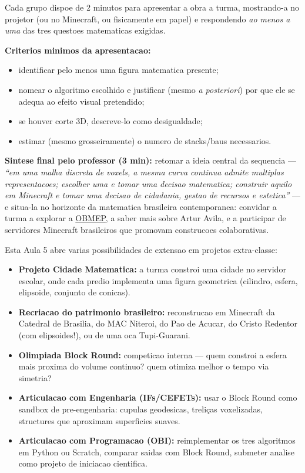 \documentclass[12pt,a4paper]{scrartcl}
\newcommand{\tempo}[1]{\textnormal{\footnotesize\color{bg!90!white}\textsf{#1}}}
\begin{document}
\begin{atividade}[5.4 --- Apresentacao e sintese coletiva \quad\tempo{10 min}]\label{at:54}
Cada grupo dispoe de 2 minutos para apresentar a obra a turma, mostrando-a no projetor (ou no Minecraft, ou fisicamente em papel) e respondendo \emph{ao menos a uma} das tres questoes matematicas exigidas.

\textbf{Criterios minimos da apresentacao:}
\begin{itemize}[leftmargin=1.3em,itemsep=0.1em,topsep=0.2em,nosep]
  \item identificar pelo menos uma figura matematica presente;
  \item nomear o algoritmo escolhido e justificar (mesmo \emph{a posteriori}) por que ele se adequa ao efeito visual pretendido;
  \item se houver corte 3D, descreve-lo como desigualdade;
  \item estimar (mesmo grosseiramente) o numero de stacks/baus necessarios.
\end{itemize}

\textbf{Sintese final pelo professor (3 min):} retomar a ideia central da sequencia --- \emph{\enquote{em uma malha discreta de voxels, a mesma curva continua admite multiplas representacoes; escolher uma e tomar uma decisao matematica; construir aquilo em Minecraft e tomar uma decisao de cidadania, gestao de recursos e estetica}} --- e situa-la no horizonte da matematica brasileira contemporanea: convidar a turma a explorar a \hyperref[sec:obmep]{OBMEP}, a saber mais sobre Artur Avila, e a participar de servidores Minecraft brasileiros que promovam construcoes colaborativas.
\end{atividade}

\begin{minec}
Esta Aula 5 abre varias possibilidades de extensao em projetos extra-classe:
\begin{itemize}[leftmargin=1.3em,itemsep=0.15em,topsep=0.3em,nosep]
  \item \textbf{Projeto Cidade Matematica:} a turma constroi uma cidade no servidor escolar, onde cada predio implementa uma figura geometrica (cilindro, esfera, elipsoide, conjunto de conicas).
  \item \textbf{Recriacao do patrimonio brasileiro:} reconstrucao em Minecraft da Catedral de Brasilia, do MAC Niteroi, do Pao de Acucar, do Cristo Redentor (com elipsoides!), ou de uma oca Tupi-Guarani.
  \item \textbf{Olimpiada Block Round:} competicao interna --- quem constroi a esfera mais proxima do volume continuo? quem otimiza melhor o tempo via simetria?
  \item \textbf{Articulacao com Engenharia (IFs/CEFETs):} usar o Block Round como sandbox de pre-engenharia: cupulas geodesicas, treliças voxelizadas, structures que aproximam superficies suaves.
  \item \textbf{Articulacao com Programacao (OBI):} reimplementar os tres algoritmos em Python ou Scratch, comparar saidas com Block Round, submeter analise como projeto de iniciacao cientifica.
\end{itemize}
\end{minec}
\end{document}
